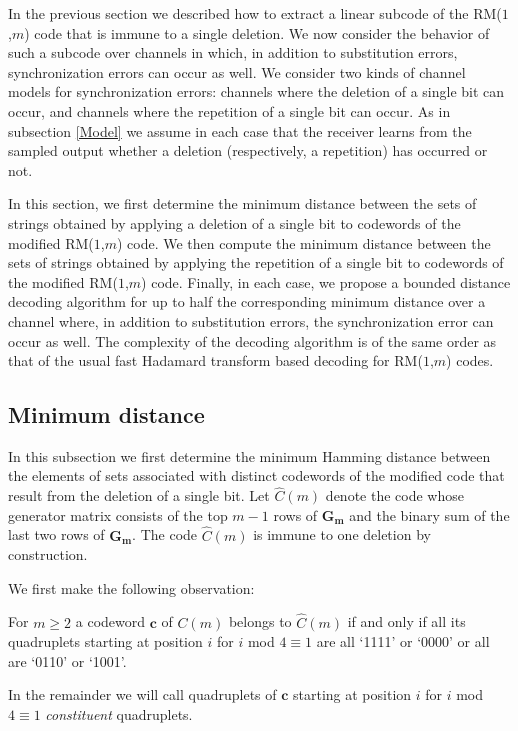 In the previous section we described how to extract a linear
subcode of the RM($1$,$m$) code that is immune to a single
deletion. We now consider the behavior of such a subcode over
channels in which, in addition to substitution errors,
synchronization errors can occur as well. We consider two kinds of
channel models for synchronization errors: channels where the
deletion of a single bit can occur, and channels where the
repetition of  a single bit can occur. As in subsection
\ref{Model} we assume in each case that the receiver learns from
the sampled output whether a deletion (respectively, a repetition)
has occurred or not.

In this section, we first determine the minimum distance between
the sets of strings obtained by applying a deletion of a single
bit to codewords of the modified RM($1$,$m$) code. We then compute
the minimum distance between the sets of strings obtained by
applying the repetition of a single bit to codewords of the
modified RM($1$,$m$) code. Finally, in each case, we propose a
bounded distance decoding algorithm for up to half the
corresponding minimum distance over a channel where, in addition
to substitution errors, the synchronization error can occur as
well. The complexity of the decoding algorithm is of the same
order as that of the usual fast Hadamard transform based decoding
for RM($1$,$m$) codes.

\subsection{Minimum distance}

In this subsection we first determine the minimum Hamming distance
between the elements of sets associated with distinct codewords of
the modified code that result from the
deletion of a single bit.
Let $\hat{C}(m)$ denote the code whose
generator matrix consists of the top $m-1$ rows of $\mathbf{G_m}$
and the binary sum of the last two rows of $\mathbf{G_m}$. The
code $\hat{C}(m)$ is immune to one deletion by construction.

We first make the following observation:
\begin{remark}\label{RE1}
For $m \geq 2$ a codeword $\mathbf{c}$ of $C(m)$ belongs to
$\hat{C}(m)$ if and only if all its quadruplets starting at
position $i$ for $i $ mod $4 \equiv 1$ are all `1111' or `0000' or
all are `0110' or `1001'.
\end{remark}
In the remainder we will call quadruplets of $\mathbf{c}$ starting at
position $i$ for $i $ mod $4 \equiv 1$ \textit{constituent}
quadruplets.


